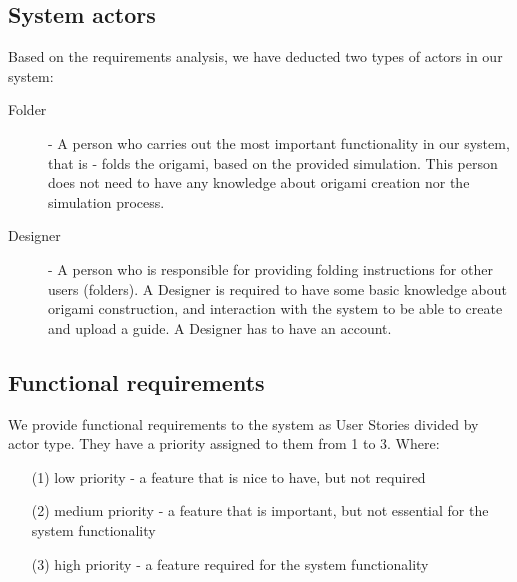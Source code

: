 \subsection{System actors}

Based on the requirements analysis, we have deducted two types of actors in our system:

\begin{description}
	\item[Folder] \label{actors:folder} - A person who carries out the most important functionality in our system,
		that is - folds the origami, based on the provided simulation. This person does not need to have any
		knowledge about origami creation nor the simulation process.
	\item[Designer] \label{actors:designer} - A person who is responsible for providing folding instructions
		for other users (folders). A Designer is required to have some basic knowledge about origami construction, 
		and interaction with the system to be able to create and upload a guide. A Designer has to have an account.
\end{description}

\newcommand{\requirement}[2]{\item #2. (#1)}
\subsection{Functional requirements}

We provide functional requirements to the system as User Stories divided by actor type.
They have a priority assigned to them from 1 to 3. Where:

\begin{enumerate}
	\item[(1)] low priority - a feature that is nice to have, but not required 
	\item[(2)] medium priority - a feature that is important, but not essential for the system functionality
	\item[(3)] high priority - a feature required for the system functionality 
\end{enumerate}

